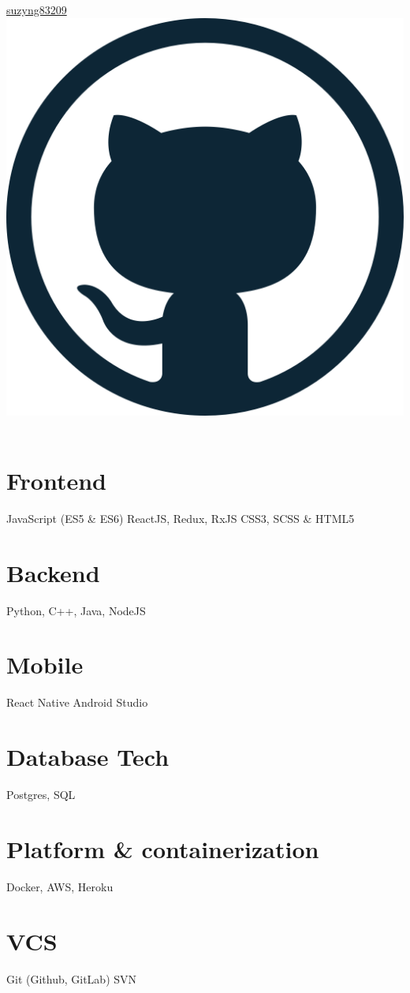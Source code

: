 \documentclass[]{friggeri-cv}
\begin{document}
\begin{aside}
  \href{https://github.com/suzyng83209}{suzyng83209 \includegraphics[scale=0.02]{github-512.png}}
  \
  \
  \section{Frontend}
  JavaScript (ES5 \& ES6)
  ReactJS, Redux, RxJS
  CSS3, SCSS \& HTML5
  \section{Backend}
  Python, C++, Java, NodeJS
  \section{Mobile}
  React Native
  Android Studio
  \section{Database Tech}
  Postgres, SQL
  \section{Platform \& containerization}
  Docker, AWS, Heroku
  \section{VCS}
  Git (Github, GitLab)
  SVN
\end{aside}
\end{document}
